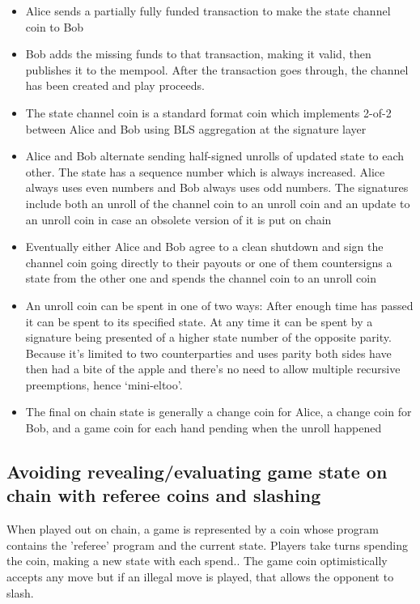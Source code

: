 \documentclass[a4paper]{article}
\begin{document}
\begin{multicols}{2}
\begin{itemize}
    \item Alice sends a partially fully funded transaction to make the state channel coin to Bob
    \item Bob adds the missing funds to that transaction, making it valid, then publishes it to the mempool. After the transaction goes through, the channel has been created and play proceeds.
    \item The state channel coin is a standard format coin which implements 2-of-2 between Alice and Bob using BLS aggregation at the signature layer
    \item Alice and Bob alternate sending half-signed unrolls of updated state to each other. The state has a sequence number which is always increased. Alice always uses even numbers and Bob always uses odd numbers. The signatures include both an unroll of the channel coin to an unroll coin and an update to an unroll coin in case an obsolete version of it is put on chain
    \item Eventually either Alice and Bob agree to a clean shutdown and sign the channel coin going directly to their payouts or one of them countersigns a state from the other one and spends the channel coin to an unroll coin
    \item An unroll coin can be spent in one of two ways: After enough time has passed it can be spent to its specified state. At any time it can be spent by a signature being presented of a higher state number of the opposite parity. Because it’s limited to two counterparties and uses parity both sides have then had a bite of the apple and there’s no need to allow multiple recursive preemptions, hence ‘mini-eltoo’.
    \item The final on chain state is generally a change coin for Alice, a change coin for Bob, and a game coin for each hand pending when the unroll happened
\end{itemize}

\subsection{Avoiding revealing/evaluating game state on chain with referee coins and slashing}

When played out on chain, a game is represented by a coin whose program contains the 'referee' program and the current state.  Players take turns spending the coin, making a new state with each spend.. The game coin optimistically accepts any move but if an illegal move is played, that allows the opponent to slash.


\end{multicols}
\end{document}
